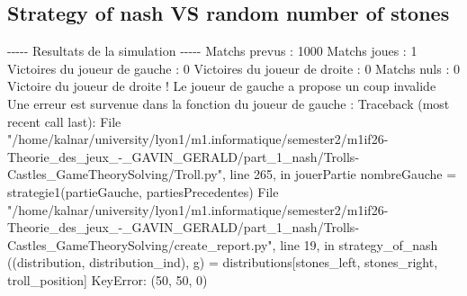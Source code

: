 \documentclass{article}%
\begin{document}
\subsection{Strategy of nash VS random number of stones}%
\label{subsec:Strategy of nash VS random number of stones}%
{-}{-}{-}{-}{-} Resultats de la simulation {-}{-}{-}{-}{-}\newline%
		\newline%
Matchs prevus : 1000\newline%
Matchs joues : 1\newline%
\newline%
Victoires du joueur de gauche : 0\newline%
Victoires du joueur de droite : 0\newline%
Matchs nuls : 0\newline%
\newline%
Victoire du joueur de droite ! Le joueur de gauche a propose un coup invalide\newline%
Une erreur est survenue dans la fonction du joueur de gauche : \newline%
Traceback (most recent call last):\newline%
  File "/home/kalnar/university/lyon1/m1.informatique/semester2/m1if26{-}Theorie\_des\_jeux\_{-}\_GAVIN\_GERALD/part\_1\_nash/Trolls{-}Castles\_GameTheorySolving/Troll.py", line 265, in jouerPartie\newline%
    nombreGauche = strategie1(partieGauche, partiesPrecedentes)\newline%
  File "/home/kalnar/university/lyon1/m1.informatique/semester2/m1if26{-}Theorie\_des\_jeux\_{-}\_GAVIN\_GERALD/part\_1\_nash/Trolls{-}Castles\_GameTheorySolving/create\_report.py", line 19, in strategy\_of\_nash\newline%
    ((distribution, distribution\_ind), g) = distributions{[}stones\_left, stones\_right, troll\_position{]}\newline%
KeyError: (50, 50, 0)\newline%

%
\end{document}
